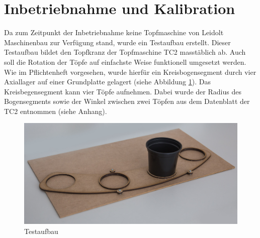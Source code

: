 \newpage
\section{Inbetriebnahme und Kalibration}

Da zum Zeitpunkt der Inbetriebnahme keine Topfmaschine von Leidolt Maschinenbau zur Verfügung stand, wurde ein Testaufbau erstellt. Dieser Testaufbau bildet den Topfkranz der Topfmaschine TC2 masstäblich ab. Auch soll die Rotation der Töpfe auf einfachste Weise funktionell umgesetzt werden. Wie im Pflichtenheft vorgesehen, wurde hierfür ein Kreisbogensegment durch vier Axiallager auf einer Grundplatte gelagert (siehe Abbildung \ref{fig:testaufbau}). Das Kreisbegensegment kann vier Töpfe aufnehmen. Dabei wurde der Radius des Bogensegments sowie der Winkel zwischen zwei Töpfen aus dem Datenblatt der TC2 entnommen (siehe Anhang). 

\begin{figure}[H]
	\includegraphics[width=1\textwidth]{Illustrationen/7-Inbetriebnahme_und_Kalibration/testaufbau.jpg}
	\caption{Testaufbau}
	\label{fig:testaufbau}
\end{figure}